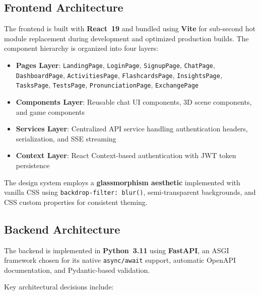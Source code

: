 \documentclass[conference]{IEEEtran}
\begin{document}
\subsection{Frontend Architecture}

The frontend is built with \textbf{React~19} and bundled using \textbf{Vite} for sub-second hot module replacement during development and optimized production builds. The component hierarchy is organized into four layers:

\begin{itemize}[leftmargin=*]
    \item \textbf{Pages Layer}: \texttt{LandingPage}, \texttt{LoginPage}, \texttt{SignupPage}, \texttt{ChatPage}, \texttt{DashboardPage}, \texttt{ActivitiesPage}, \texttt{FlashcardsPage}, \texttt{InsightsPage}, \texttt{TasksPage}, \texttt{TestsPage}, \texttt{PronunciationPage}, \texttt{ExchangePage}
    \item \textbf{Components Layer}: Reusable chat UI components, 3D scene components, and game components
    \item \textbf{Services Layer}: Centralized API service handling authentication headers, serialization, and SSE streaming
    \item \textbf{Context Layer}: React Context-based authentication with JWT token persistence
\end{itemize}

The design system employs a \textbf{glassmorphism aesthetic} implemented with vanilla CSS using \texttt{backdrop-filter: blur()}, semi-transparent backgrounds, and CSS custom properties for consistent theming.

\subsection{Backend Architecture}

The backend is implemented in \textbf{Python~3.11} using \textbf{FastAPI}, an ASGI framework chosen for its native \texttt{async/await} support, automatic OpenAPI documentation, and Pydantic-based validation.

Key architectural decisions include:
\end{document}
